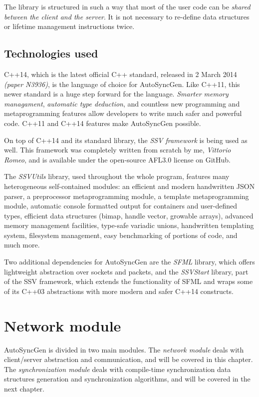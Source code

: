 \documentclass{report}
\begin{document}
            The library is structured in such a way that most of the user code can be \emph{shared between the client and the server}. 
            It is not necessary to re-define data structures or lifetime management instructions twice.

        \section{Technologies used}
            C++14, which is the latest official C++ standard, released in 2 March 2014 \emph{(paper N3936)}, is the language of choice for AutoSyncGen.
            Like C++11, this newer standard is a huge step forward for the language. \emph{Smarter memory managament}, \emph{automatic type deduction}, and countless new programming and metaprogramming features allow developers to write much safer and powerful code.
            C++11 and C++14 features make AutoSyncGen possible.

            On top of C++14 and its standard library, the \emph{SSV framework} is being used as well. This framework was completely written from scratch by me, \emph{Vittorio Romeo}, and is available under the open-source AFL3.0 license on GitHub.

            The \emph{SSVUtils} library, used throughout the whole program, features many heterogeneous self-contained modules: an efficient and modern handwritten JSON parser, a preprocessor metaprogramming module, a template metaprogramming module, automatic console formatted output for containers and user-defined types, efficient data structures (bimap, handle vector, growable arrays), advanced memory management facilities, type-safe variadic unions, handwritten templating system, filesystem management, easy benchmarking of portions of code, and much more.

            Two additional dependencies for AutoSyncGen are the \emph{SFML} library, which offers lightweight abstraction over sockets and packets, and the \emph{SSVStart} library, part of the SSV framework, which extends the functionality of SFML and wraps some of its C++03 abstractions with more modern and safer C++14 constructs.
    
    \newpage

    \chapter{Network module}
        AutoSyncGen is divided in two main modules. 
        The \emph{network module} deals with client/server abstraction and communication, and will be covered in this chapter.
        The \emph{synchronization module} deals with compile-time synchronization data structures generation and synchronization algorithms, and will be covered in the next chapter.
\end{document}
